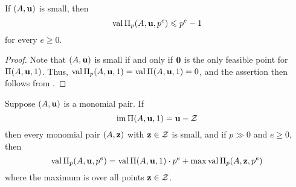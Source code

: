 \documentclass[11pt]{amsart}
\begin{document}
\begin{lemma}
   \label{trivial value bound: L}
   If $(A, \mathbf{u})$ is small, then
   \[ \operatorname{val} \Pi_p(A, \mathbf{u}, p^e) \leqslant p^{e} -1 \]
   for every $e \geq 0$.
\end{lemma}

\begin{proof}
   Note that $(A, \mathbf{u})$ is small if and only if $\mathbf{0}$ is the only feasible point for $\Pi(A, \mathbf{u}, 1)$.
   Thus, $\operatorname{val} \Pi_p(A, \mathbf{u}, 1) = \operatorname{val} \Pi(A, \mathbf{u}, 1) = 0$, and the assertion then follows from .
\end{proof}

\begin{proposition}
   \label{follow-leftovers: P}
   Suppose $(A, \mathbf{u})$ is a monomial pair.
   If
   \[ \operatorname{im} \Pi(A, \mathbf{u}, 1) = \mathbf{u} - \mathcal{Z}\]
   then every monomial pair $(A, \mathbf{z})$ with $\mathbf{z} \in \mathcal{Z}$ is small, and if $p \gg 0$ and $e \geq 0$, then
   \[ \operatorname{val} \Pi_p(A, \mathbf{u}, p^e) = \operatorname{val} \Pi(A, \mathbf{u}, 1) \cdot p^e + \max \operatorname{val} \Pi_p(A, \mathbf{z}, p^e) \]
   where the maximum is over all points $\mathbf{z} \in \mathcal{Z}$.
\end{proposition}

\end{document}

